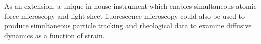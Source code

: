  As an extension, a unique in-house instrument which enables simultaneous atomic force microscopy and light sheet fluorescence microscopy could also be used to produce simultaneous particle tracking and rheological data to examine diffusive dynamics as a function of strain.\par

\newpage
